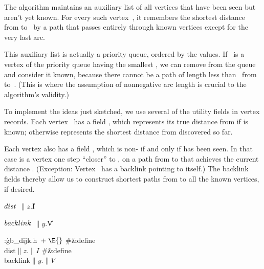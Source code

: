 The algorithm maintains an auxiliary list of all vertices that have been
seen but aren't yet known. For every such vertex~, it remembers
the shortest distance~ from  to~ by a path that
passes entirely
through known vertices except for the very last arc.

This auxiliary list is actually a priority queue, ordered by the 
values.
If ~is a vertex of the priority queue having the smallest , we
can
remove  from the queue and consider it known, because there cannot be
a path of length less than~ from  to~. (This is
where the
assumption of nonnegative arc length is crucial to the algorithm's validity.)

\fi

To implement the ideas just sketched, we use several of the utility
fields in vertex records. Each vertex~ has a  field ,
which represents its true distance from  if  is known;
otherwise
 represents the shortest distance from 
discovered so far.

Each vertex  also has a  field , which is non-\PB{$\NULL$}
if and only if  has been seen. In that case 
is a vertex one
step ``closer'' to , on a path from  to  that
achieves the
current distance . (Exception:
Vertex~ has a backlink pointing to itself.) The backlink
fields thereby allow us to construct shortest paths from  to all the
known vertices, if desired.

\Y\B\4\D$\\{dist}$ \5
$\|z.{}$\|I\par
\B\4\D$\\{backlink}$ \5
$\|y.{}$\|V%
\par
\Y\B\4:\.{gb\_dijk.h\,}\X${}\mathrel+\E{}$\6
\8\#\&{define} \\{dist}\5${}\|z.\|I{}$\6
\8\#\&{define} \\{backlink}\5${}\|y.\|V{}$\par
\fi

